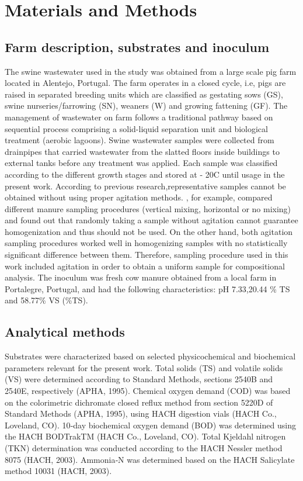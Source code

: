 \section{Materials and Methods}
\subsection{Farm description, substrates and inoculum}
The swine wastewater used in the study was obtained from a large scale pig farm located in Alentejo, Portugal. The farm operates in a closed cycle, i.e, pigs are raised in separated breeding units which are classified as gestating sows (GS), swine nurseries/farrowing (SN), weaners (W) and growing fattening (GF). The management of wastewater on farm follows a traditional pathway based on sequential process comprising a solid-liquid separation unit and biological treatment (aerobic lagoons). 
Swine wastewater samples were collected from drainpipes that carried wastewater from the slatted floors inside buildings to external tanks before any treatment was applied. Each sample was classified according to the different growth stages and stored at - 20\textdegree C until usage in the present work. According to previous research,representative samples cannot be obtained without using proper agitation methods. \cite{Zhu_2004}, for example, compared different manure sampling procedures (vertical mixing, horizontal or no mixing) and found out that randomly taking a sample without agitation cannot guarantee homogenization and thus should not be used. On the other hand, both agitation sampling procedures worked well in homogenizing samples with no statistically significant difference between them.  Therefore, sampling procedure used in this work included agitation in order to obtain a uniform sample for compositional analysis. The inoculum was fresh cow manure obtained from a local farm in Portalegre, Portugal, and had the following characteristics: pH 7.33,20.44 \pm \% TS and 58.77\% VS (\%TS).

\subsection{Analytical methods}
Substrates were characterized based on selected physicochemical and biochemical parameters relevant for the present work. Total solids (TS) and volatile solids (VS) were determined according to Standard Methods, sections 2540B and 2540E, respectively (APHA, 1995). Chemical oxygen demand (COD) was based on the colorimetric dichromate closed reflux method from section 5220D of Standard Methods (APHA, 1995), using HACH digestion vials (HACH Co., Loveland, CO). 10‐day biochemical oxygen demand (BOD) was determined using the HACH BODTrakTM (HACH Co., Loveland, CO). Total Kjeldahl nitrogen (TKN) determination was conducted according to the HACH Nessler method 8075 (HACH, 2003). Ammonia‐N was determined based on the HACH Salicylate method 10031 (HACH, 2003). 
